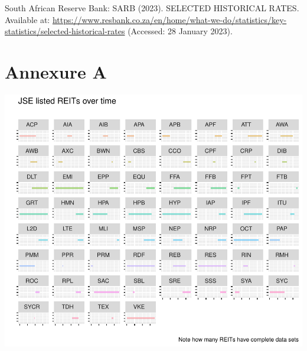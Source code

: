 \documentclass[11pt,preprint, authoryear]{elsarticle}
\let\origfigure\figure
\let\endorigfigure\endfigure
\renewenvironment{figure}[1][2] {
    \expandafter\origfigure\expandafter[H]
} {
    \endorigfigure
}
\numberwithin{equation}{section}
\numberwithin{figure}{section}
\numberwithin{table}{section}
\begin{document}
South African Reserve Bank: SARB (2023). SELECTED HISTORICAL RATES.
Available at:
\url{https://www.resbank.co.za/en/home/what-we-do/statistics/key-statistics/selected-historical-rates}
(Accessed: 28 January 2023).

\newpage

\hypertarget{annexure-a}{%
\section*{Annexure A}\label{annexure-a}}

\begin{figure}
\centering
\includegraphics{Fin_Metrics_Project_files/figure-latex/unnamed-chunk-22-1.pdf}
\caption{REITs Dataset}
\end{figure}


\end{document}
